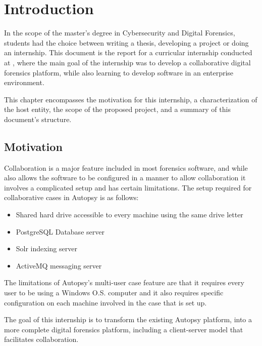 
\chapter{Introduction}
\label{ch:introduction}

In the scope of the master's degree in Cybersecurity and Digital Forensics, students had the choice between writing a thesis, developing a project or doing an internship.
This document is the report for a curricular internship conducted at \company, where the main goal of the internship was to develop a collaborative digital forensics platform,
while also learning to develop software in an enterprise environment.

This chapter encompasses the motivation for this internship, a characterization of the host entity, the scope of the proposed project, and a summary of this document's structure.

\section{Motivation}

Collaboration is a major feature included in most forensics software, and while  \cite{autopsy} also allows the software to be
configured in a manner to allow collaboration it involves a complicated setup and has certain limitations.
The setup required for collaborative cases in Autopsy is as follows:
\begin{itemize}
 \item Shared hard drive accessible to every machine using the same drive letter
 \item PostgreSQL Database server 
 \item Solr indexing server
 \item ActiveMQ messaging server
\end{itemize}

The limitations of Autopsy's multi-user case feature are that it requires every user to be using a Windows O.S. computer and it also requires specific configuration on each
machine involved in the case that is set up.

The goal of this internship is to transform the existing Autopsy platform, into a more complete digital forensics platform, including a client-server model that facilitates collaboration.

